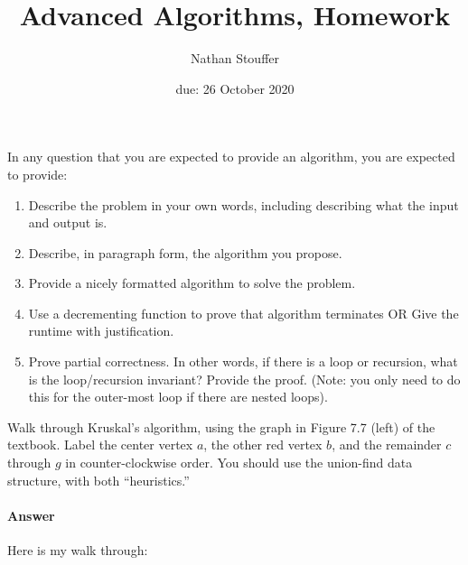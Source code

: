 \documentclass{article}
\title{Advanced Algorithms, Homework \hwnum}
\author{Nathan Stouffer}
\date{due: 26 October 2020}
\begin{document}
\maketitle

In any question that you are expected to provide an algorithm, you are
expected to provide:
\begin{enumerate}
    \item Describe the problem in your own words, including describing what the input and output is.
    \item Describe, in paragraph form, the algorithm you propose.
    \item Provide a nicely formatted algorithm to solve the problem.
    \item Use a decrementing function to prove that algorithm terminates OR  Give the runtime with justification.
    \item Prove partial correctness.
    In other words, if there is a loop or recursion, what is the loop/recursion invariant? Provide the proof.
    (Note: you only need to do this for the outer-most loop if there are nested loops).
\end{enumerate}



\nextprob
{}

Walk through Kruskal's algorithm, using the graph in Figure 7.7 (left) of the
textbook.  Label the center vertex $a$, the other red vertex $b$, and the
remainder $c$ through $g$ in counter-clockwise order.  You should use the
union-find data structure, with both ``heuristics.''

\paragraph{Answer}


Here is my walk through:
\end{document}
